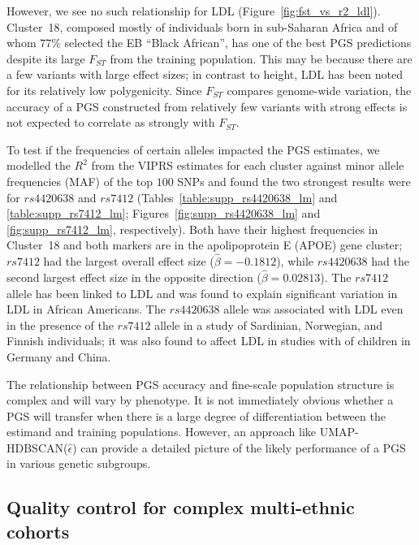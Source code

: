 However, we see no such relationship for LDL (Figure~\ref{fig:fst_vs_r2_ldl}). Cluster~18, composed mostly of individuals born in sub-Saharan Africa and of whom $77\%$ selected the EB ``Black African'', has one of the best PGS predictions despite its large $F_{ST}$ from the training population. This may be because there are a few variants with large effect sizes; in contrast to height, LDL has been noted for its relatively low polygenicity\citep{ding_polygenic_2023}. Since $F_{ST}$ compares genome-wide variation, the accuracy of a PGS constructed from relatively few variants with strong effects is not expected to correlate as strongly with $F_{ST}$.

To test if the frequencies of certain alleles impacted the PGS estimates, we modelled the $R^2$ from the VIPRS estimates for each cluster against minor allele frequencies (MAF) of the top $100$ SNPs and found the two strongest results were for $rs4420638$ and $rs7412$ (Tables~\ref{table:supp_rs4420638_lm} and \ref{table:supp_rs7412_lm}; Figures~\ref{fig:supp_rs4420638_lm} and \ref{fig:supp_rs7412_lm}, respectively).  Both have their highest frequencies in Cluster~18 and both markers are in the apolipoprotein E (APOE) gene cluster; $rs7412$ had the largest overall effect size ($\hat{\beta}=-0.1812$), while $rs4420638$ had the second largest effect size in the opposite direction ($\hat{\beta}=0.02813$). The $rs7412$ allele has been linked to LDL\citep{bennet_pleiotropy_2010} and was found to explain significant variation in LDL in African Americans\citep{rasmussen-torvik_high_2012}. The $rs4420638$ allele was associated with LDL even in the presence of the $rs7412$ allele in a study of Sardinian, Norwegian, and Finnish individuals\citep{sanna_fine_2011}; it was also found to affect LDL in studies with of children in Germany\citep{breitling_genetic_2015} and China\citep{wang_associations_2022}.

The relationship between PGS accuracy and fine-scale population structure is complex and will vary by phenotype. It is not immediately obvious whether a PGS will transfer when there is a large degree of differentiation between the estimand and training populations. However, an approach like UMAP-HDBSCAN($\hat{\epsilon}$) can provide a detailed picture of the likely performance of a PGS in various genetic subgroups.

\clearpage

\subsection{Quality control for complex multi-ethnic cohorts}

